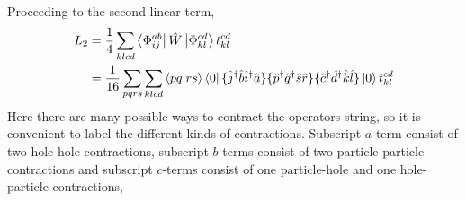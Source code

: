 Proceeding to the second linear term,
\begin{equation}
    \begin{aligned}
    L_2 &= \frac{1}{4}\sum_{klcd} \bra{\Phi^{ab}_{ij}} \hat{W} \ket{\Phi^{cd}_{kl}} t^{cd}_{kl} \\
        &= \frac{1}{16}\sum_{pqrs} \sum_{klcd} \bra{pq} \ket{rs} \bra{0}
            \{\hat{j}^\dagger \hat{b} \hat{i}^\dagger  \hat{a} \}
            \{\hat{p}^\dagger \hat{q}^\dagger \hat{s} \hat{r} \}
            \{\hat{c}^\dagger \hat{d}^\dagger \hat{k} \hat{l} \}
        \ket{0}t^{cd}_{kl}
    \end{aligned}
\end{equation}
Here there are many possible ways to contract the operators string, so it is convenient
to label the different kinds of contractions. Subscript $a$-term consist of two
hole-hole contractions, subscript $b$-terms consist of two particle-particle
contractions and subscript $c$-terms consist of one particle-hole and one
hole-particle contractions,
